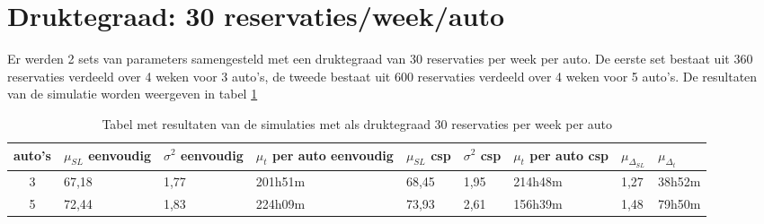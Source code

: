 \section{Druktegraad: 30 reservaties/week/auto}
Er werden 2 sets van parameters samengesteld met een druktegraad van 30 reservaties per week per auto. 
De eerste set bestaat uit 360 reservaties verdeeld over 4 weken voor 3 auto's, de tweede bestaat uit 600 reservaties verdeeld over 4 weken voor 5 auto's. 
De resultaten van de simulatie worden weergeven in tabel \ref{tab:resultaten30}
\begin{table}[h]
	\centering
	\begin{tabular}{ | c | p{1.5cm} | p{1.5cm} | p{1.5cm} | p{1.5cm} | p{1.5cm} | p{1.5cm} | p{1.5cm} | p{1.5cm} |}
		\hline
		auto's & $\mu_{ SL}$ eenvoudig & $\sigma^2$ eenvoudig & $\mu_{ t}$ per auto eenvoudig & $\mu_{ SL}$ csp & $\sigma^2$ csp & $\mu_{ t}$ per auto csp & $\mu_{\Delta_{ SL}}$ & $\mu_{\Delta_{ t}}$ \\ \hline
		3 & 67,18 & 1,77 & 201h51m & 68,45 & 1,95 & 214h48m & 1,27 & 38h52m  \\ \hline
		5 & 72,44 & 1,83 & 224h09m & 73,93 & 2,61 & 156h39m & 1,48 & 79h50m \\ \hline
	\end{tabular}
	\caption{Tabel met resultaten van de simulaties met als druktegraad 30 reservaties per week per auto}
	\label{tab:resultaten30}
\end{table}

